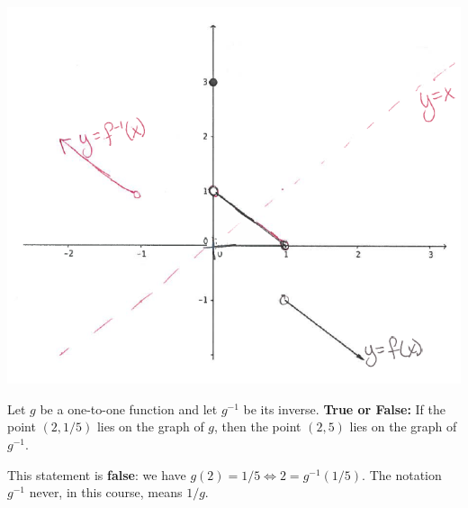 \documentclass[nooutcomes]{ximera}
\begin{document}
\begin{problem}
\begin{enumerate}
\begin{freeResponse}
	 \begin{image}
          \includegraphics[scale = 0.4]{figure5.png}
        \end{image}
	
	
	 \end{freeResponse} 

  \end{enumerate}
\end{problem}

\begin{problem}

  Let $g$ be a one-to-one function and let $g^{-1}$ be its inverse.
  \textbf{True or False:}
  If the point $(2, 1/5)$ lies on the graph of $g$, then the point $(2, 5)$ lies on the graph of $g^{-1}$.
  \begin{freeResponse}
    This statement is \textbf{false}: we have $g(2) = 1/5 \iff 2 = g^{-1}(1/5)$.
    The notation $g^{-1}$ never, in this course, means $1/g$.
  \end{freeResponse}
\end{problem}
\end{document}
